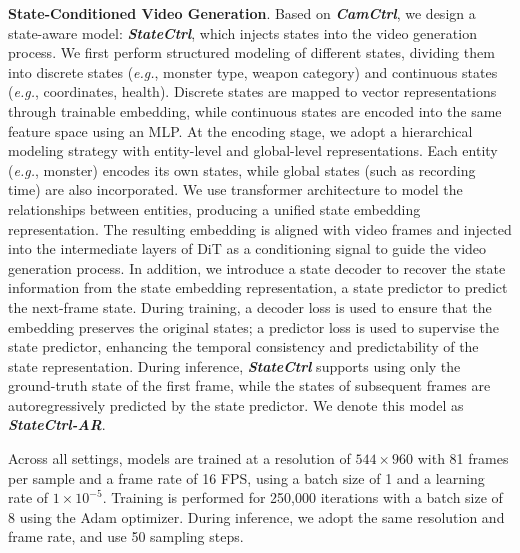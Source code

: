 \noindent
\textbf{State-Conditioned Video Generation}.
Based on \textit{\textbf{CamCtrl}}, we design a state-aware model: \textit{\textbf{StateCtrl}}, which injects states into the video generation process.
We first perform structured modeling of different states, dividing them into discrete states (\textit{e.g.}, monster type, weapon category) and continuous states (\textit{e.g.}, coordinates, health).
Discrete states are mapped to vector representations through trainable embedding, while continuous states are encoded into the same feature space using an MLP.
At the encoding stage, we adopt a hierarchical modeling strategy with entity-level and global-level representations.
Each entity (\textit{e.g.}, monster) encodes its own states, while global states (such as recording time) are also incorporated.
We use transformer \cite{vaswani2017attention} architecture to model the relationships between entities, producing a unified state embedding representation.
The resulting embedding is aligned with video frames and injected into the intermediate layers of DiT as a conditioning signal to guide the video generation process.
In addition, we introduce a state decoder to recover the state information from the state embedding representation, a state predictor to predict the next-frame state.
During training, a decoder loss is used to ensure that the embedding preserves the original states;
a predictor loss is used to supervise the state predictor, enhancing the temporal consistency and predictability of the state representation.
During inference, \textit{\textbf{StateCtrl}} supports using only the ground-truth state of the first frame, while the states of subsequent frames are autoregressively predicted by the state predictor.
We denote this model as \textbf{\textit{StateCtrl-AR}}.

\noindent
Across all settings, models are trained at a resolution of $544 \times 960$ with 81 frames per sample and a frame rate of 16 FPS, using a batch size of 1 and a learning rate of $1\times10^{-5}$.
Training is performed for 250,000 iterations with a batch size of 8 using the Adam optimizer.
During inference, we adopt the same resolution and frame rate, and use 50 sampling steps.

